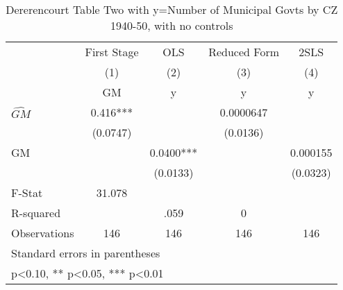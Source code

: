 \begin{table}[htbp]\centering
\def\sym#1{\ifmmode^{#1}\else\(^{#1}\)\fi}
\caption{Dererencourt Table Two with y=Number of Municipal Govts by CZ 1940-50, with no controls}
\begin{tabular}{l*{4}{c}}
\toprule
                    & First Stage   &         OLS   &Reduced Form   &        2SLS   \\
                    &\multicolumn{1}{c}{(1)}&\multicolumn{1}{c}{(2)}&\multicolumn{1}{c}{(3)}&\multicolumn{1}{c}{(4)}\\
                    &\multicolumn{1}{c}{GM}&\multicolumn{1}{c}{y}&\multicolumn{1}{c}{y}&\multicolumn{1}{c}{y}\\
\midrule
$\hat{GM}$          &       0.416***&               &   0.0000647   &               \\
                    &    (0.0747)   &               &    (0.0136)   &               \\
\addlinespace
GM                  &               &      0.0400***&               &    0.000155   \\
                    &               &    (0.0133)   &               &    (0.0323)   \\
\midrule
F-Stat              &      31.078   &               &               &               \\
R-squared           &               &        .059   &           0   &               \\
Observations        &         146   &         146   &         146   &         146   \\
\bottomrule
\multicolumn{5}{l}{\footnotesize Standard errors in parentheses}\\
\multicolumn{5}{l}{\footnotesize * p<0.10, ** p<0.05, *** p<0.01}\\
\end{tabular}
\end{table}
